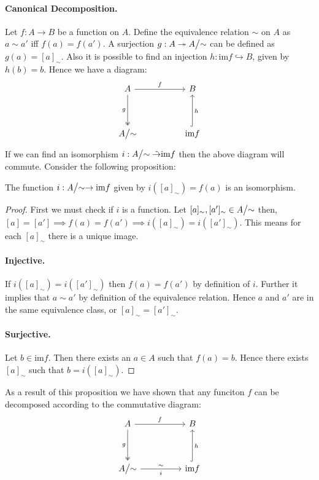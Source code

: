 \paragraph{Canonical Decomposition.} Let $f:A \to B$ be a function on $A$. Define the equivalence relation $\sim$ on $A$ as $a\sim a'$ iff $f(a) = f(a')$. A surjection $g:A\twoheadrightarrow A\bign/\sim$ can be defined as $g(a) = [a]_{\sim}$. Also it is possible to find an injection $h:\text{im}f \hookrightarrow B$, given by $h(b) = b$. Hence we have a diagram:
\[
  \begin{tikzcd}[sep=huge]
    A \arrow{r}{f}  \arrow[two heads, swap]{d}{g} & B \\  A\bign/\sim & \text{im}f \arrow[hook, swap]{u}{h}
  \end{tikzcd}
\]
If we can find an isomorphism $i:A\bign/\sim \tilde{\rightarrow} \text{im}f$ then the above diagram will commute. Consider the following proposition:
\begin{proposition}
  The function $i:A\bign/\sim \to \text{im}f$ given by $i([a]_\sim) = f(a)$ is an isomorphism.
\end{proposition}
\begin{proof}
  First we must check if $i$ is a function. Let $[a]_\sim,[a']_\sim\in A\bign/\sim$ then, $[a]= [a'] \implies f(a) = f(a') \implies i([a]_\sim) = i([a']_\sim)$. This means for each $[a]_\sim$ there is a unique image. 
  \paragraph{Injective.} If $i([a]_\sim) = i([a']_\sim)$ then $f(a)=f(a')$ by definition of $i$. Further it implies that $a\sim a'$ by definition of the equivalence relation. Hence $a$ and $a'$ are in the same equivalence class, or $[a]_\sim = [a']_\sim$. 
  \paragraph{Surjective.} Let $b\in\text{im}f$. Then there exists an $a\in A$ such that $f(a) = b$. Hence there exists $[a]_\sim$ such that $b = i([a]_\sim)$.
\end{proof}
As a result of this proposition we have shown that any funciton $f$ can be decomposed according to the commutative diagram:
\[
  \begin{tikzcd}[sep=huge]
    A \arrow{r}{f}  \arrow[two heads, swap]{d}{g} & B \\  A\bign/\sim \arrow[swap]{r}{i}[swap]{\sim} & \text{im}f \arrow[hook, swap]{u}{h}
  \end{tikzcd}
\]
